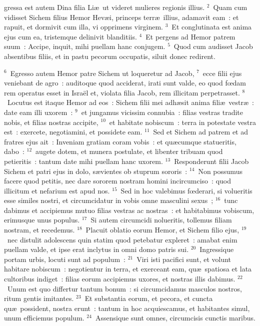 \bchapter
{}gressa est autem Dina filia Li\ae\ ut videret mulieres regionis illius.
${}^{2}$~Quam cum vidisset Sichem filius Hemor Hev\ae i, princeps terr\ae\ illius, adamavit eam~: et rapuit, et dormivit cum illa, vi opprimens virginem.
${}^{3}$~Et conglutinata est anima ejus cum ea, tristemque delinivit blanditiis.
${}^{4}$~Et pergens ad Hemor patrem suum~: Accipe, inquit, mihi puellam hanc conjugem.
${}^{5}$~Quod cum audisset Jacob absentibus filiis, et in pastu pecorum occupatis, siluit donec redirent.


${}^{6}$~Egresso autem Hemor patre Sichem ut loqueretur ad Jacob,
${}^{7}$~ecce filii ejus veniebant de agro~: auditoque quod acciderat, irati sunt valde, eo quod fœdam rem operatus esset in Isra\"el et, violata filia Jacob, rem illicitam perpetrasset.
${}^{8}$~Locutus est itaque Hemor ad eos~: Sichem filii mei adh\ae sit anima fili\ae\ vestr\ae~: date eam illi uxorem~:
${}^{9}$~et jungamus vicissim connubia~: filias vestras tradite nobis, et filias nostras accipite,
${}^{10}$~et habitate nobiscum~: terra in potestate vestra est~: exercete, negotiamini, et possidete eam.
${}^{11}$~Sed et Sichem ad patrem et ad fratres ejus ait~: Inveniam gratiam coram vobis~: et qu\ae cumque statueritis, dabo~:
${}^{12}$~augete dotem, et munera postulate, et libenter tribuam quod petieritis~: tantum date mihi puellam hanc uxorem.
${}^{13}$~Responderunt filii Jacob Sichem et patri ejus in dolo, s\ae vientes ob stuprum sororis~:
${}^{14}$~Non possumus facere quod petitis, nec dare sororem nostram homini incircumciso~: quod illicitum et nefarium est apud nos.
${}^{15}$~Sed in hoc valebimus fœderari, si volueritis esse similes nostri, et circumcidatur in vobis omne masculini sexus~;
${}^{16}$~tunc dabimus et accipiemus mutuo filias vestras ac nostras~: et habitabimus vobiscum, erimusque unus populus.
${}^{17}$~Si autem circumcidi nolueritis, tollemus filiam nostram, et recedemus.
${}^{18}$~Placuit oblatio eorum Hemor, et Sichem filio ejus,
${}^{19}$~nec distulit adolescens quin statim quod petebatur expleret~: amabat enim puellam valde, et ipse erat inclytus in omni domo patris sui.
${}^{20}$~Ingressique portam urbis, locuti sunt ad populum~:
${}^{21}$~Viri isti pacifici sunt, et volunt habitare nobiscum~: negotientur in terra, et exerceant eam, qu\ae\ spatiosa et lata cultoribus indiget~: filias eorum accipiemus uxores, et nostras illis dabimus.
${}^{22}$~Unum est quo differtur tantum bonum~: si circumcidamus masculos nostros, ritum gentis imitantes.
${}^{23}$~Et substantia eorum, et pecora, et cuncta qu\ae\ possident, nostra erunt~: tantum in hoc acquiescamus, et habitantes simul, unum efficiemus populum.
${}^{24}$~Assensique sunt omnes, circumcisis cunctis maribus.


